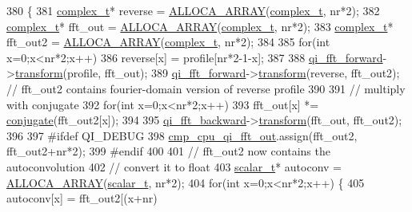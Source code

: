\begin{DoxyCode}
380 \{
381     \hyperlink{scalar__types_8h_abaffcd8bea58063cc6c608dda082ad05}{complex\_t}* reverse = \hyperlink{std__incl_8h_a37dbccb865134ee3a70c5044b365ded7}{ALLOCA\_ARRAY}(\hyperlink{scalar__types_8h_abaffcd8bea58063cc6c608dda082ad05}{complex\_t}, nr*2);
382     \hyperlink{scalar__types_8h_abaffcd8bea58063cc6c608dda082ad05}{complex\_t}* fft\_out = \hyperlink{std__incl_8h_a37dbccb865134ee3a70c5044b365ded7}{ALLOCA\_ARRAY}(\hyperlink{scalar__types_8h_abaffcd8bea58063cc6c608dda082ad05}{complex\_t}, nr*2);
383     \hyperlink{scalar__types_8h_abaffcd8bea58063cc6c608dda082ad05}{complex\_t}* fft\_out2 = \hyperlink{std__incl_8h_a37dbccb865134ee3a70c5044b365ded7}{ALLOCA\_ARRAY}(\hyperlink{scalar__types_8h_abaffcd8bea58063cc6c608dda082ad05}{complex\_t}, nr*2);
384 
385     \textcolor{keywordflow}{for}(\textcolor{keywordtype}{int} x=0;x<nr*2;x++)
386         reverse[x] = profile[nr*2-1-x];
387 
388     \hyperlink{class_c_p_u_tracker_a1b17351aec1bcd117d6f1e304904b282}{qi\_fft\_forward}->\hyperlink{classkissfft_ad2db80b9c9b087fb36fbe8b3b0078df8}{transform}(profile, fft\_out);
389     \hyperlink{class_c_p_u_tracker_a1b17351aec1bcd117d6f1e304904b282}{qi\_fft\_forward}->\hyperlink{classkissfft_ad2db80b9c9b087fb36fbe8b3b0078df8}{transform}(reverse, fft\_out2); \textcolor{comment}{// fft\_out2 contains
       fourier-domain version of reverse profile}
390 
391     \textcolor{comment}{// multiply with conjugate}
392     \textcolor{keywordflow}{for}(\textcolor{keywordtype}{int} x=0;x<nr*2;x++)
393         fft\_out[x] *= \hyperlink{cpu__tracker_8cpp_acbdcd9cf414b5dca4a7c2b9cae44832c}{conjugate}(fft\_out2[x]);
394 
395     \hyperlink{class_c_p_u_tracker_aa0ff71d20678c294eeeebb0b0eec1fc8}{qi\_fft\_backward}->\hyperlink{classkissfft_ad2db80b9c9b087fb36fbe8b3b0078df8}{transform}(fft\_out, fft\_out2);
396 
397 \textcolor{preprocessor}{#ifdef QI\_DEBUG}
398     \hyperlink{test_8cu_a9d2895908a386c1f380b8085f1e28340}{cmp\_cpu\_qi\_fft\_out}.assign(fft\_out2, fft\_out2+nr*2);
399 \textcolor{preprocessor}{#endif}
400 
401     \textcolor{comment}{// fft\_out2 now contains the autoconvolution}
402     \textcolor{comment}{// convert it to float}
403     \hyperlink{scalar__types_8h_a03fcef84665498b9cfcf9c7cc25574e9}{scalar\_t}* autoconv = \hyperlink{std__incl_8h_a37dbccb865134ee3a70c5044b365ded7}{ALLOCA\_ARRAY}(\hyperlink{scalar__types_8h_a03fcef84665498b9cfcf9c7cc25574e9}{scalar\_t}, nr*2);
404     \textcolor{keywordflow}{for}(\textcolor{keywordtype}{int} x=0;x<nr*2;x++)  \{
405         autoconv[x] = fft\_out2[(x+nr)%

\end{DoxyCode}
